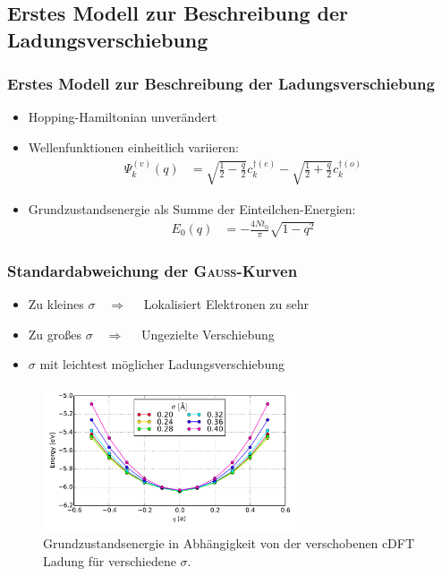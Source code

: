 \subsection{Erstes Modell zur Beschreibung der Ladungsverschiebung}
\begin{frame}
\frametitle{Erstes Modell zur Beschreibung der Ladungsverschiebung}
\begin{itemize}
\setlength{\itemsep}{.5cm}
\item Hopping-Hamiltonian unverändert
\item Wellenfunktionen einheitlich variieren:
\begin{align*}
\Psi_k^{(v)}(q) &= \sqrt{\frac{1}{2}-\frac{q}{2}}c_k^{\dagger(e)}- \sqrt{\frac{1}{2}+\frac{q}{2}}c_{k}^{\dagger(o)}
\end{align*}
\item Grundzustandsenergie als Summe der Einteilchen-Energien:
\begin{align*}
E_0(q) &= -\frac{4Nt_0}{\pi} \sqrt{1-q^2}
\end{align*}
\end{itemize}
\end{frame}

\begin{frame}
\frametitle{Standardabweichung der \textsc{Gauß}-Kurven}
\begin{itemize}
\item Zu kleines $\sigma\quad\Rightarrow\quad$ Lokalisiert Elektronen zu sehr
\item Zu großes $\sigma\quad\Rightarrow\quad$ Ungezielte Verschiebung
\item $\sigma$ mit leichtest möglicher Ladungsverschiebung
\end{itemize}
\begin{figure}[!t]
	\centering
	\includegraphics[width = 7.5cm]{Images/Hydrogen/charging/gaussian_sigmas}
	\caption{Grundzustandsenergie in Abhängigkeit von der verschobenen cDFT Ladung für verschiedene $\sigma$.}
	\label{image_gaussian_sigmas_hydrogen}
\end{figure}
\end{frame}

